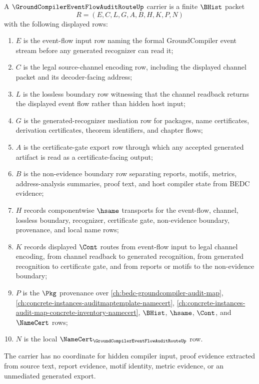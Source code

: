 \begin{definition}
\label{def:groundcompiler-event-flow-audit-route-carrier}
A $\GroundCompilerEventFlowAuditRouteUp$ carrier is a finite $\BHist$ packet
$$
R=(E,C,L,G,A,B,H,K,P,N)
$$
with the following displayed rows:
\begin{enumerate}
\item $E$ is the event-flow input row naming the formal GroundCompiler event stream before any generated recognizer can read it;
\item $C$ is the legal source-channel encoding row, including the displayed channel packet and its decoder-facing address;
\item $L$ is the lossless boundary row witnessing that the channel readback returns the displayed event flow rather than hidden host input;
\item $G$ is the generated-recognizer mediation row for packages, name certificates, derivation certificates, theorem identifiers, and chapter flows;
\item $A$ is the certificate-gate export row through which any accepted generated artifact is read as a certificate-facing output;
\item $B$ is the non-evidence boundary row separating reports, motifs, metrics, address-analysis summaries, proof text, and host compiler state from BEDC evidence;
\item $H$ records componentwise $\hsame$ transports for the event-flow, channel, lossless boundary, recognizer, certificate gate, non-evidence boundary, provenance, and local name rows;
\item $K$ records displayed $\Cont$ routes from event-flow input to legal channel encoding, from channel readback to generated recognition, from generated recognition to certificate gate, and from reports or motifs to the non-evidence boundary;
\item $P$ is the $\Pkg$ provenance over \autoref{ch:bedc-groundcompiler-audit-map}, \autoref{ch:concrete-instances-auditmaptemplate-namecert}, \autoref{ch:concrete-instances-audit-map-concrete-inventory-namecert}, $\BHist$, $\hsame$, $\Cont$, and $\NameCert$ rows;
\item $N$ is the local $\NameCert_{\GroundCompilerEventFlowAuditRouteUp}$ row.
\end{enumerate}
The carrier has no coordinate for hidden compiler input, proof evidence extracted from source text, report evidence, motif identity, metric evidence, or an unmediated generated export.
\end{definition}

